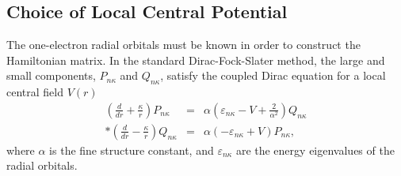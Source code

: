 \documentclass[preprint, floatfix, pra, showpacs, showkeys]{revtex4}
\begin{document}
\subsection{Choice of Local Central Potential}
The one-electron radial orbitals must be known in order to construct the
Hamiltonian matrix. In the standard Dirac-Fock-Slater method, the large and
small components, $P_{n\kappa}$ and $Q_{n\kappa}$, satisfy the coupled Dirac
equation for a local central field $V(r)$
\begin{eqnarray}
\label{eq_dirac}
\left(\frac{d}{d r} + \frac{\kappa}{r}\right)P_{n\kappa} &=&
\alpha\left(\varepsilon_{n\kappa} - V + \frac{2}{\alpha^2}\right)Q_{n\kappa}
\nonumber\\*
\left(\frac{d}{d r} - \frac{\kappa}{r}\right)Q_{n\kappa} &=&
\alpha\left(-\varepsilon_{n\kappa} + V\right)P_{n\kappa},
\end{eqnarray}
where $\alpha$ is the fine structure constant, and $\varepsilon_{n\kappa}$ are
the energy eigenvalues of the radial orbitals.
\end{document}

